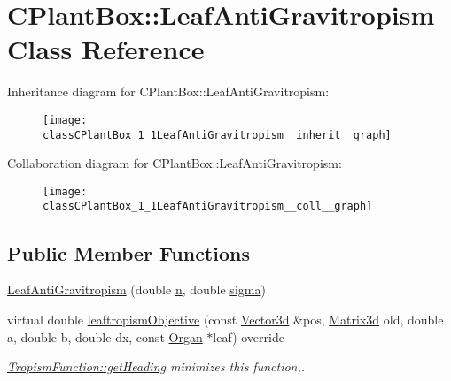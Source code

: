 \hypertarget{classCPlantBox_1_1LeafAntiGravitropism}{}\section{C\+Plant\+Box\+:\+:Leaf\+Anti\+Gravitropism Class Reference}
\label{classCPlantBox_1_1LeafAntiGravitropism}


Inheritance diagram for C\+Plant\+Box\+:\+:Leaf\+Anti\+Gravitropism\+:\nopagebreak
\begin{figure}[H]
\begin{center}
\leavevmode
\texttt{[image: classCPlantBox\_1\_1LeafAntiGravitropism\_\_inherit\_\_graph]}
\end{center}
\end{figure}


Collaboration diagram for C\+Plant\+Box\+:\+:Leaf\+Anti\+Gravitropism\+:\nopagebreak
\begin{figure}[H]
\begin{center}
\leavevmode
\texttt{[image: classCPlantBox\_1\_1LeafAntiGravitropism\_\_coll\_\_graph]}
\end{center}
\end{figure}
\subsection*{Public Member Functions}
\begin{DoxyCompactItemize}
\item 
\hyperlink{classCPlantBox_1_1LeafAntiGravitropism_a3b2eb7861d5c9ffe4a57f7374dd6ebd5}{Leaf\+Anti\+Gravitropism} (double \hyperlink{classCPlantBox_1_1LeafTropismFunction_a21d8d756f8b9f6015b546def33b01c89}{n}, double \hyperlink{classCPlantBox_1_1LeafTropismFunction_a82a3dc11056a65501bc4535749c304b6}{sigma})
\item 
virtual double \hyperlink{classCPlantBox_1_1LeafAntiGravitropism_a94f4abfb99515326081deebff7906ca2}{leaftropism\+Objective} (const \hyperlink{classCPlantBox_1_1Vector3d}{Vector3d} \&pos, \hyperlink{classCPlantBox_1_1Matrix3d}{Matrix3d} old, double a, double b, double dx, const \hyperlink{classCPlantBox_1_1Organ}{Organ} $\ast$leaf) override
\begin{DoxyCompactList}\small\item\em \hyperlink{classCPlantBox_1_1TropismFunction_adb52b88734a94fe1365a00e02c7e6be5}{Tropism\+Function\+::get\+Heading} minimizes this function,. \end{DoxyCompactList}\end{DoxyCompactItemize}
